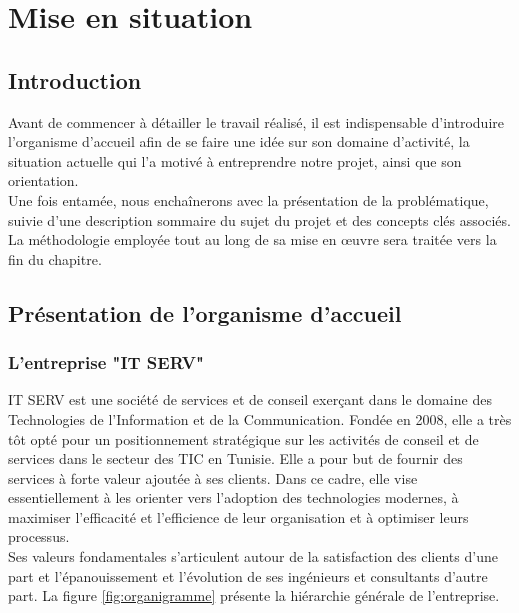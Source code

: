 
\setcounter{mtc}{2} %
\chapter{Mise en situation}
\minitoc  %

\graphicspath{{Chapitre1/figures/}}
\pagestyle{fancy}
\fancyhf{}
\fancyhead[R]{\bfseries\rightmark}
\fancyfoot[R]{\thepage}
\renewcommand{\headrulewidth}{0.5pt}
\renewcommand{\footrulewidth}{0pt}
\renewcommand{\chaptermark}[1]{\markboth{\MakeUppercase{\chaptername~\thechapter. #1 }}{}}
\renewcommand{\sectionmark}[1]{\markright{\thechapter.\thesection~ #1}}

\begin{spacing}{1.5}

\section*{Introduction}
Avant de commencer à détailler le travail réalisé, il est indispensable d'introduire l'organisme d'accueil afin de se faire une idée sur son domaine d'activité, la situation actuelle qui l'a motivé à entreprendre notre projet, ainsi que son orientation.\\
Une fois entamée, nous enchaînerons avec la présentation de la problématique, suivie d'une description sommaire du sujet du projet et des concepts clés associés.\\
La méthodologie employée tout au long de sa mise en œuvre sera traitée vers la fin du chapitre.


\section{Présentation de l'organisme d'accueil}
\subsection{L'entreprise "IT SERV"}
IT SERV est une société de services et de conseil exerçant dans le domaine des Technologies de l'Information et de la Communication.
Fondée en 2008, elle a très tôt opté pour un positionnement stratégique sur les activités de conseil et de services dans le secteur des TIC en Tunisie. Elle a pour but de fournir des services à forte valeur ajoutée à ses clients. Dans ce cadre, elle vise essentiellement à les orienter vers l'adoption des technologies modernes, à maximiser l'efficacité et l'efficience de leur organisation et à optimiser leurs processus.\\
Ses valeurs fondamentales s'articulent autour de la satisfaction des clients d'une part et l'épanouissement et l'évolution de ses ingénieurs et consultants d'autre part. La figure \ref{fig:organigramme} présente la hiérarchie générale de l'entreprise.\\


\end{spacing}
